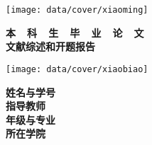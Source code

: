 \thispagestyle{empty}

{
\setlength{\parindent}{0em}
\renewcommand{\baselinestretch}{2}

\vspace*{-7mm}

\begin{center}
  \texttt{[image: data/cover/xiaoming]}
\end{center}

\vspace{-1mm}

{
\renewcommand{\baselinestretch}{1.8}
\heiti\erhao\bfseries
\centering
本~~科~~生~~毕~~业~~论~~文 \\
文献综述和开题报告 \par
}

\vspace{4em}

\begin{center}
  \texttt{[image: data/cover/xiaobiao]}
\end{center}

\vspace{3em}
\def\zjuu[#1]#2{%
  \underline{\hbox to #1{\hfill#2\hfil}}}

{
	\renewcommand{\baselinestretch}{1.65}
	\sanhao
	\centering
	{\kaiti\bfseries 姓名与学号} \; \underline{\makebox[13em]{\songti\zjuauthornamec~~\zjuauthorid}} \\ \vspace{0.9em}
	{\kaiti\bfseries 指导教师} \; \underline{\makebox[14em]{\songti\zjumentorc}} \\ \vspace{0.9em}
	{\kaiti\bfseries 年级与专业} \; \underline{\makebox[13em]{\songti\zjugrade~~\zjumajor}} \\ \vspace{0.9em}
	{\kaiti\bfseries 所在学院} \; \underline{\makebox[14em]{\songti\zjucollegec}} \par
}


}


